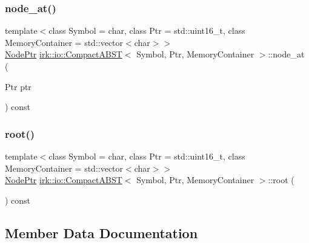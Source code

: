 \subsubsection{\texorpdfstring{node\+\_\+at()}{node\_at()}}
{\footnotesize\ttfamily template$<$class Symbol = char, class Ptr = std\+::uint16\+\_\+t, class Memory\+Container = std\+::vector$<$char$>$$>$ \\
\mbox{\hyperlink{structirk_1_1io_1_1CompactABST_1_1NodePtr}{Node\+Ptr}} \mbox{\hyperlink{classirk_1_1io_1_1CompactABST}{irk\+::io\+::\+Compact\+A\+B\+ST}}$<$ Symbol, Ptr, Memory\+Container $>$\+::node\+\_\+at (\begin{DoxyParamCaption}\item[{Ptr}]{ptr }\end{DoxyParamCaption}) const\hspace{0.3cm}{\ttfamily [inline]}}

\mbox{\label{classirk_1_1io_1_1CompactABST_acb1286c5e308a6835f2dc6d1c953f872}} 
\subsubsection{\texorpdfstring{root()}{root()}}
{\footnotesize\ttfamily template$<$class Symbol = char, class Ptr = std\+::uint16\+\_\+t, class Memory\+Container = std\+::vector$<$char$>$$>$ \\
\mbox{\hyperlink{structirk_1_1io_1_1CompactABST_1_1NodePtr}{Node\+Ptr}} \mbox{\hyperlink{classirk_1_1io_1_1CompactABST}{irk\+::io\+::\+Compact\+A\+B\+ST}}$<$ Symbol, Ptr, Memory\+Container $>$\+::root (\begin{DoxyParamCaption}{ }\end{DoxyParamCaption}) const\hspace{0.3cm}{\ttfamily [inline]}}



\subsection{Member Data Documentation}
\mbox{\label{classirk_1_1io_1_1CompactABST_a3a2aa7c2af6de1ddfc8ee25d42d700e5}} 
